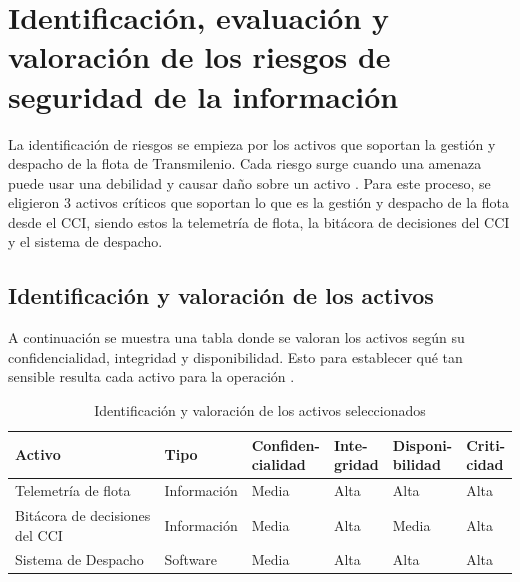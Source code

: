 \section{Identificación, evaluación y valoración de los riesgos de seguridad de la información}

La identificación de riesgos se empieza por los activos que soportan la gestión y despacho de la flota de Transmilenio. Cada riesgo surge cuando una amenaza puede usar una debilidad y causar daño sobre un activo \parencite{iso27005,funcionpublica2025}. Para este proceso, se eligieron 3 activos críticos que soportan lo que es la gestión y despacho de la flota desde el CCI, siendo estos la telemetría de flota, la bitácora de decisiones del CCI y el sistema de despacho.

\subsection{Identificación y valoración de los activos}

A continuación se muestra una tabla donde se valoran los activos según su confidencialidad, integridad y disponibilidad. Esto para establecer qué tan sensible resulta cada activo para la operación \parencite{mintic2021,transmilenio2025pesi}.

\begin{table}[H]
	\centering
	\caption{Identificación y valoración de los activos seleccionados}
	\label{tab:activos-riesgo}
	
	\footnotesize
	\renewcommand{\arraystretch}{1.25}
	\setlength{\tabcolsep}{3pt}
	
	\begin{tabularx}{\textwidth}{
			@{}
			>{\raggedright\arraybackslash}X
			>{\raggedright\arraybackslash}p{1.8cm}
			>{\centering\arraybackslash}p{1.65cm}
			>{\centering\arraybackslash}p{1.35cm}
			>{\centering\arraybackslash}p{1.65cm}
			>{\centering\arraybackslash}p{1.35cm}
			@{}
		}
		\toprule
		\textbf{Activo} &
		\textbf{Tipo} &
		\makecell{\textbf{Confiden-}\\\textbf{cialidad}} &
		\makecell{\textbf{Inte-}\\\textbf{gridad}} &
		\makecell{\textbf{Disponi-}\\\textbf{bilidad}} &
		\makecell{\textbf{Criti-}\\\textbf{cidad}} \\
		\midrule
		
		Telemetría de flota &
		Información &
		Media &
		Alta &
		Alta &
		Alta \\
		
		Bitácora de decisiones del CCI &
		Información &
		Media &
		Alta &
		Media &
		Alta \\
		
		Sistema de Despacho &
		Software &
		Media &
		Alta &
		Alta &
		Alta \\
		
		\bottomrule
	\end{tabularx}
\end{table}

